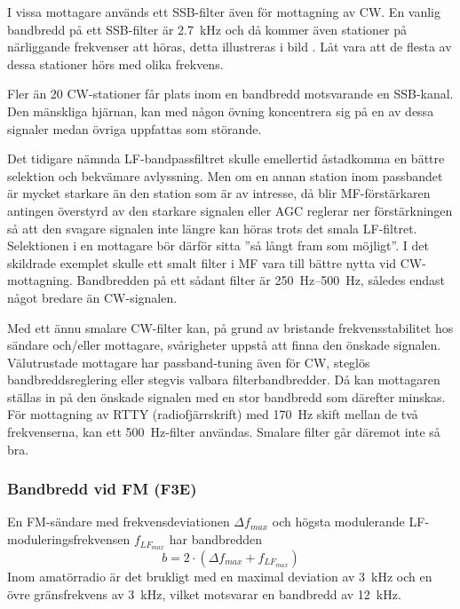 I vissa mottagare används ett SSB-filter även för mottagning av CW.
En vanlig bandbredd på ett SSB-filter är \SI{2,7}{\kilo\hertz} och då kommer
även stationer på närliggande frekvenser att höras, detta illustreras i bild
.
Låt vara att de flesta av dessa stationer hörs med olika frekvens.


Fler än 20 CW-stationer får plats inom en bandbredd motsvarande en SSB-kanal.
Den mänskliga hjärnan, kan med någon övning koncentrera sig på en av dessa
signaler medan övriga uppfattas som störande.

Det tidigare nämnda LF-bandpassfiltret skulle emellertid åstadkomma en
bättre selektion och bekvämare avlyssning.
Men om en annan station inom passbandet är mycket starkare än den station
som är av intresse, då blir MF-förstärkaren antingen överstyrd av den
starkare signalen eller AGC reglerar ner förstärkningen så att den svagare
signalen inte längre kan höras trots det smala LF-filtret.
Selektionen i en mottagare bör därför sitta ''så långt fram som möjligt''.
I det skildrade exemplet skulle ett smalt filter i MF vara till bättre nytta
vid CW-mottagning.
Bandbredden på ett sådant filter är \SIrange{250}{500}{\hertz}, således endast
något bredare än CW-signalen.

Med ett ännu smalare CW-filter kan, på grund av bristande frekvensstabilitet hos
sändare och/eller mottagare, svårigheter uppstå att finna den önskade signalen.
Välutrustade mottagare har passband-tuning även för CW, steglös
bandbreddsreglering eller stegvis valbara filterbandbredder.
Då kan mottagaren ställas in på den önskade signalen med en stor bandbredd
som därefter minskas.
För mottagning av RTTY (radiofjärrskrift) med \SI{170}{\hertz} skift mellan de
två frekvenserna, kan ett \SI{500}{\hertz}-filter användas.
Smalare filter går däremot inte så bra.

\subsubsection{Bandbredd vid FM (F3E)}
\label{bandbredd_fm}

En FM-sändare med frekvensdeviationen \(\Delta f_{max}\) och högsta
modulerande LF-moduleringsfrekvensen \(f_{LF_{max}}\) har bandbredden
\[ b = 2 \cdot (\Delta f_{max} + f_{LF_{max}}) \]
Inom amatörradio är det brukligt med en maximal deviation av \SI{3}{\kilo\hertz}
och en övre gränsfrekvens av \SI{3}{\kilo\hertz}, vilket motsvarar en bandbredd
av \SI{12}{\kilo\hertz}.


